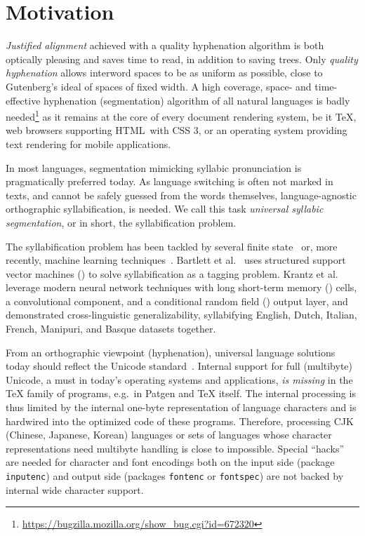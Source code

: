 \documentclass{csbulletin}
\let\stress=\emph
\let\program=\textrm %
\let\acro\relax
\providecommand\HTML{HTML\xspace}
\providecommand\CSS{CSS\xspace}
\providecommand{\etal}{et al.\xspace}
\newcommand{\package}[1]{\texttt{#1}\xspace}
\newcommand{\Patgen}{\program{Patgen}\xspace}
\begin{document}
\section{Motivation}
\stress{Justified alignment} achieved with a quality hyphenation algorithm is both optically pleasing and saves time to read, in addition to saving trees.
%
Only \stress{quality hyphenation} allows interword spaces to be as uniform as possible, close to Gutenberg's ideal of spaces of fixed width.
%
A high coverage, space- and time-effective hyphenation (segmentation) algorithm of all natural languages is badly needed\footnote{\url{https://bugzilla.mozilla.org/show_bug.cgi?id=672320}} as it remains at the core of every document rendering system, be it \TeX, web browsers supporting \HTML\ with \CSS3, or an operating system providing text rendering for mobile applications.

In most languages, segmentation mimicking syllabic pronunciation is pragmatically preferred today.
%
As language switching is often not marked in texts, and cannot be safely guessed from the words themselves, language-agnostic orthographic syllabification, is needed.
We call this task \stress{universal syllabic segmentation}, or in short, the syllabification problem.

The syllabification problem has been tackled by several finite
state~\cite{tex:haralambous06} or, more recently, machine learning
techniques~\cite{nlp:bartlett-etal-2008-automatic,tex:marchandetal2007,nlp:Shao2018,nlp:trogkanis-elkan-2010-conditional}.
Bartlett \etal~\cite{nlp:bartlett-etal-2008-automatic} uses structured
support vector machines (\acro{SVM}) to solve syllabification as a
tagging problem. Krantz \etal~\cite{nlp:Krantz2019} leverage modern
neural network techniques with long short-term memory (\acro{LSTM})
cells, a convolutional component, and a conditional random field
(\acro{CRF}) output layer, and demonstrated cross-linguistic
generalizability, syllabifying English, Dutch, Italian, French,
Manipuri, and Basque data\-sets together.

From an orthographic viewpoint (hyphenation), universal language solutions today should reflect the Unicode standard~\cite{text:Unicode:Unicode15.1}.
Internal support for full (multibyte) Unicode, a must in today's operating systems and applications, \stress{is missing} in the \TeX{} family of programs, e.g.\ in \Patgen and \TeX{} itself.
%
The internal processing is thus limited by the internal one-byte representation of language characters and is hardwired into the optimized code of these programs.
%
Therefore, processing CJK (Chinese, Japanese, Korean) languages or sets of languages whose character representations need multibyte handling is close to impossible. 
%
Special ``hacks'' are needed for character and font encodings both on the input side (package \package{inputenc}) and output side (packages \package{fontenc} or \package{fontspec}) are not backed by internal wide character support.
\end{document}
